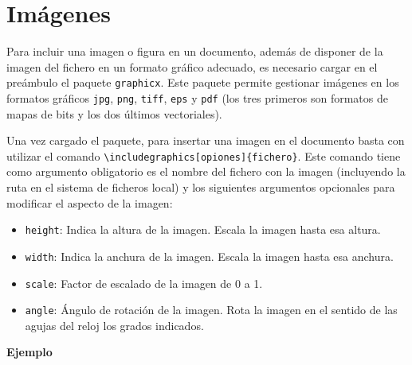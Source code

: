 \documentclass[
  letterpaper,
  DIV=11,
  numbers=noendperiod]{scrreport}
\providecommand{\tightlist}{%
  \setlength{\itemsep}{0pt}\setlength{\parskip}{0pt}}\usepackage{longtable,booktabs,array}
\begin{document}

\hypertarget{imuxe1genes}{%
\chapter{Imágenes}\label{imuxe1genes}}

Para incluir una imagen o figura en un documento, además de disponer de
la imagen del fichero en un formato gráfico adecuado, es necesario
cargar en el preámbulo el paquete \texttt{graphicx}. Este paquete
permite gestionar imágenes en los formatos gráficos \texttt{jpg},
\texttt{png}, \texttt{tiff}, \texttt{eps} y \texttt{pdf} (los tres
primeros son formatos de mapas de bits y los dos últimos vectoriales).

Una vez cargado el paquete, para insertar una imagen en el documento
basta con utilizar el comando
\texttt{\textbackslash{}includegraphics{[}opiones{]}\{fichero\}}. Este
comando tiene como argumento obligatorio es el nombre del fichero con la
imagen (incluyendo la ruta en el sistema de ficheros local) y los
siguientes argumentos opcionales para modificar el aspecto de la imagen:

\begin{itemize}
\tightlist
\item
  \texttt{height}: Indica la altura de la imagen. Escala la imagen hasta
  esa altura.
\item
  \texttt{width}: Indica la anchura de la imagen. Escala la imagen hasta
  esa anchura.
\item
  \texttt{scale}: Factor de escalado de la imagen de 0 a 1.
\item
  \texttt{angle}: Ángulo de rotación de la imagen. Rota la imagen en el
  sentido de las agujas del reloj los grados indicados.
\end{itemize}

\textbf{Ejemplo}
\end{document}
